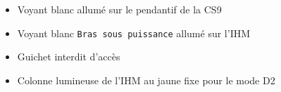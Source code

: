 \begin{UPSTIManipulation}[Modes D1 et D2]
\end{UPSTIManipulation}

\begin{UPSTIVerification}[Mode D1 et D2]
    \begin{itemize}[label=$\square$]
        \item Voyant blanc allumé sur le pendantif de la CS9
        \item Voyant blanc \texttt{Bras sous puissance} allumé sur l'IHM
        \item Guichet interdit d'accès
        \item Colonne lumineuse de l'IHM au jaune fixe pour le mode D2
    \end{itemize}
\end{UPSTIVerification}

\begin{UPSTIManipulation}[Modes A5]
\end{UPSTIManipulation}